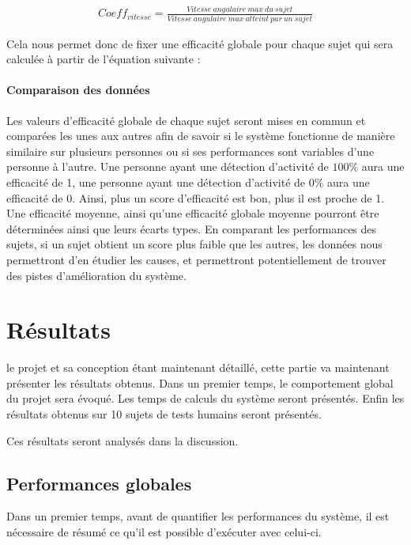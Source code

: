 \documentclass[letterpaper, twoside, 12pt, memoire, creativecommons, hyperref]{thETS}
\begin{document}
\begin{align}\label{eq:validCoeffVit}
   Coeff_{vitesse} = \frac{Vitesse\ angulaire\ max\ du\ sujet}{Vitesse\ angulaire\ max\ atteint\ par\ un\ sujet} 
\end{align}

Cela nous permet donc de fixer une efficacité globale pour chaque sujet qui sera calculée à partir de l’équation suivante : 


\subsubsection{Comparaison des données}

Les valeurs d’efficacité globale de chaque sujet seront mises en commun et comparées les unes aux autres afin de savoir si le système fonctionne de manière similaire sur plusieurs personnes ou si ses performances sont variables d’une personne à l’autre.
Une personne ayant une détection d’activité de $100\%$ aura une efficacité de 1, une personne ayant une détection d’activité de $0\%$ aura une efficacité de 0. Ainsi, plus un score d’efficacité est bon, plus il est proche de 1.
Une efficacité moyenne, ainsi qu’une efficacité globale moyenne pourront être déterminées ainsi que leurs écarts types. En comparant les performances des sujets, si un sujet obtient un score plus faible que les autres, les données nous permettront d’en étudier les causes, et permettront potentiellement de trouver des pistes d’amélioration du système.

\chapter{Résultats}

le projet et sa conception étant maintenant détaillé, cette partie va maintenant présenter les résultats obtenus. Dans un premier temps, le comportement global du projet sera évoqué. Les temps de calculs du système seront présentés. Enfin les résultats obtenus sur 10 sujets de tests humains seront présentés. 

Ces résultats seront analysés dans la discussion.

\section{Performances globales}

Dans un premier temps, avant de quantifier les performances du système, il est nécessaire de résumé ce qu'il est possible d'exécuter avec celui-ci. 
\end{document}
